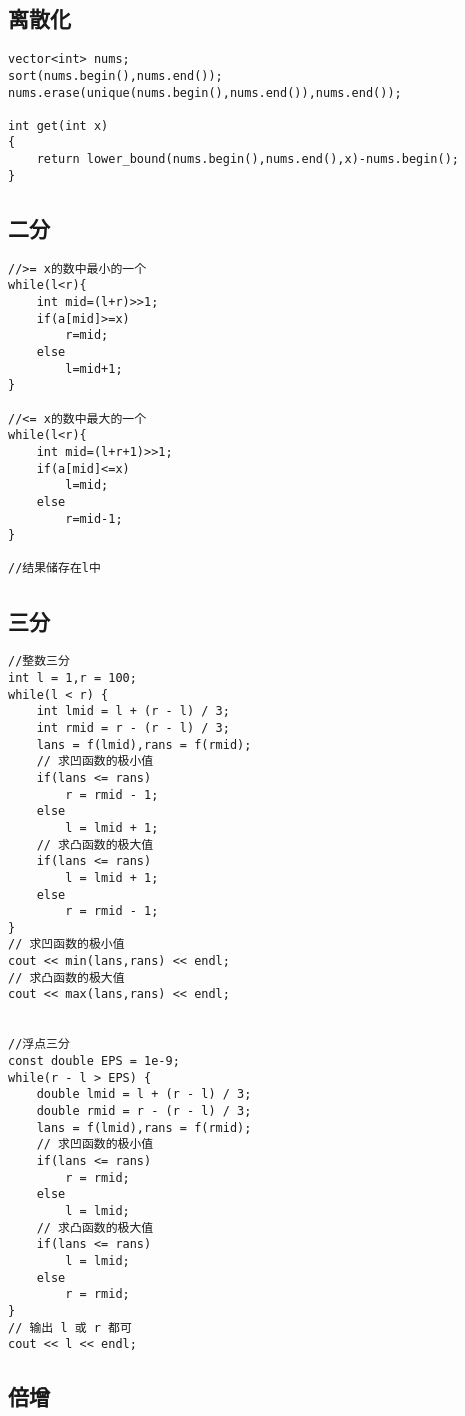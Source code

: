 \documentclass[twocolumn,a4]{article}
\begin{document}
\subsection{离散化}
\begin{lstlisting}
vector<int> nums;
sort(nums.begin(),nums.end());
nums.erase(unique(nums.begin(),nums.end()),nums.end());

int get(int x)
{
    return lower_bound(nums.begin(),nums.end(),x)-nums.begin();
}
\end{lstlisting}
\subsection{二分}
\begin{lstlisting}
//>= x的数中最小的一个
while(l<r){
    int mid=(l+r)>>1;
    if(a[mid]>=x)
        r=mid;
    else
        l=mid+1;
}

//<= x的数中最大的一个
while(l<r){
    int mid=(l+r+1)>>1;
    if(a[mid]<=x)
        l=mid;
    else
        r=mid-1;
}

//结果储存在l中
\end{lstlisting}

\subsection{三分}
\begin{lstlisting}
//整数三分
int l = 1,r = 100;
while(l < r) {
    int lmid = l + (r - l) / 3;
    int rmid = r - (r - l) / 3;
    lans = f(lmid),rans = f(rmid);
    // 求凹函数的极小值
    if(lans <= rans) 
        r = rmid - 1;
    else 
        l = lmid + 1;
    // 求凸函数的极大值
    if(lans <= rans) 
        l = lmid + 1;
    else 
        r = rmid - 1;
}
// 求凹函数的极小值
cout << min(lans,rans) << endl;
// 求凸函数的极大值
cout << max(lans,rans) << endl;


//浮点三分
const double EPS = 1e-9;
while(r - l > EPS) {
    double lmid = l + (r - l) / 3;
    double rmid = r - (r - l) / 3;
    lans = f(lmid),rans = f(rmid);
    // 求凹函数的极小值
    if(lans <= rans) 
        r = rmid;
    else 
        l = lmid;
    // 求凸函数的极大值
    if(lans <= rans) 
        l = lmid;
    else 
        r = rmid;
}
// 输出 l 或 r 都可
cout << l << endl;
\end{lstlisting}
\subsection{倍增}
\begin{lstlisting}

\end{lstlisting}
\end{document}
